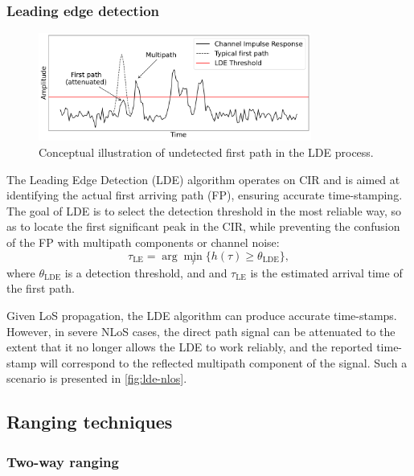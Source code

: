\subsubsection{Leading edge detection}\label{lde}
\begin{figure}[tbh]
\includegraphics[width=0.8\textwidth]{Figures/theoretical_background/uwb_lde_error.pdf}
\centering
\caption{Conceptual illustration of undetected first path in the LDE process.}
\label{fig:lde-nlos}
\end{figure}
The Leading Edge Detection (LDE) algorithm operates on CIR and is aimed at identifying the actual first arriving path (FP), ensuring accurate time-stamping. The goal of LDE is to select the detection threshold in the most reliable way, so as to locate the first significant peak in the CIR, while preventing the confusion of the FP with multipath components or channel noise:
\begin{equation}
\tau_{\text{LE}} = \arg \min_{\tau} \{ h(\tau) \geq \theta_{\text{LDE}} \},
\end{equation}
where $\theta_{\text{LDE}}$ is a detection threshold, and and $\tau_{\text{LE}}$ is the estimated arrival time of the first path.

Given LoS propagation, the LDE algorithm can produce accurate time-stamps. However, in severe NLoS cases, the direct path signal can be attenuated to the extent that it no longer allows the LDE to work reliably, and the reported time-stamp will correspond to the reflected multipath component of the signal. Such a scenario is presented in \autoref{fig:lde-nlos}.

\subsection{Ranging techniques}
\subsubsection{Two-way ranging}\label{theory:twr}

